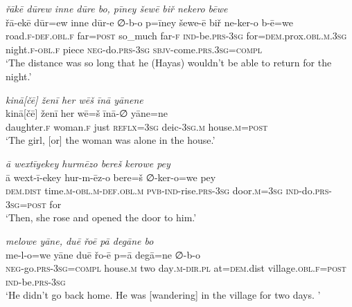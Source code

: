 \ea \label{ŽH.71}
\textit{řākē dūrew inne dūre bo, pīney šewē biř nekero bēwe} \\ 
\gll řā-ekē dūr=ew inne dūr-e ∅-b-o p=īney šewe-ē biř ne-ker-o b-ē=we \\ 
 road\textsc{\textsc{.f}}\textsc{-def}\textsc{.obl}\textsc{\textsc{.f}} far\textsc{=\textsc{post}} so\_much far\textsc{-f} \textsc{ind-}be\textsc{.prs}\textsc{-3sg} for\textsc{=dem}.prox\textsc{.obl}\textsc{.m}\textsc{.3sg} night\textsc{\textsc{.f}}\textsc{-obl}\textsc{\textsc{.f}} piece \textsc{neg-}do\textsc{.prs}\textsc{-3sg} \textsc{sbjv-}come\textsc{.prs}\textsc{.3sg}\textsc{=compl} \\ 
\glt `The distance was so long that he (Hayas) wouldn’t be able to return for the night.'
\z 
 
\ea \label{ŽH.74}
\textit{kinā[čē] ženī her wēš īnā yānene} \\ 
\gll kinā[čē] ženī her wē=š īnā-∅ yāne=ne \\ 
 daughter\textsc{\textsc{.f}} woman\textsc{\textsc{.f}} just \textsc{reflx}\textsc{=3sg} deic\textsc{-3sg}\textsc{.m} house\textsc{.m}\textsc{=\textsc{post}} \\ 
\glt `The girl, [or] the woman was alone in the house.'
\z 
 
\ea \label{ŽH.75}
\textit{ā wextīyekey hurmēzo bereš kerowe pey} \\ 
\gll ā wext-ī-ekey hur-m-ēz-o bere=š ∅-ker-o=we pey \\ 
 \textsc{dem.dist} time\textsc{.m}\textsc{-obl}\textsc{.m}\textsc{-def}\textsc{.obl}\textsc{.m} \textsc{pvb-}\textsc{ind-}rise\textsc{.prs}\textsc{-3sg} door\textsc{.m}\textsc{=3sg} \textsc{ind-}do\textsc{.prs}\textsc{-3sg}\textsc{=\textsc{post}} for \\ 
\glt `Then, she rose and opened the door to him.'
\z 
 
\ea \label{ŽH.109}
\textit{melowe yāne, duē řoē pā degāne bo} \\ 
\gll me-l-o=we yāne duē řo-ē p=ā degā=ne ∅-b-o \\ 
 \textsc{neg-}go\textsc{.prs}\textsc{-3sg}\textsc{=compl} house\textsc{.m} two day\textsc{.m}\textsc{-dir}\textsc{.pl} at\textsc{=dem}.dist village\textsc{.obl}\textsc{\textsc{.f}}\textsc{=\textsc{post}} \textsc{ind-}be\textsc{.prs}\textsc{-3sg} \\ 
\glt `He didn’t go back home. He was [wandering] in the village for two days. '
\z 
 
